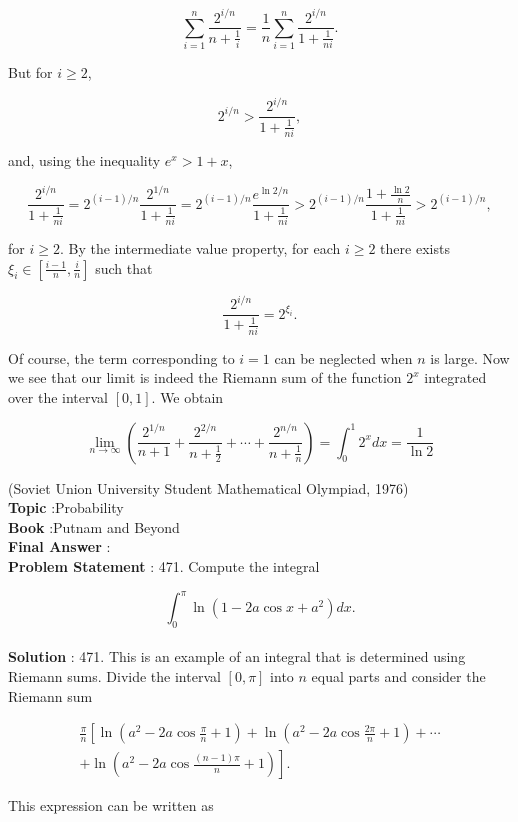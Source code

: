 \documentclass[10pt]{article}
\begin{document}
$$
\sum_{i=1}^{n} \frac{2^{i / n}}{n+\frac{1}{i}}=\frac{1}{n} \sum_{i=1}^{n} \frac{2^{i / n}}{1+\frac{1}{n i}} .
$$

But for $i \geq 2$,

$$
2^{i / n}>\frac{2^{i / n}}{1+\frac{1}{n i}},
$$

and, using the inequality $e^{x}>1+x$,

$$
\frac{2^{i / n}}{1+\frac{1}{n i}}=2^{(i-1) / n} \frac{2^{1 / n}}{1+\frac{1}{n i}}=2^{(i-1) / n} \frac{e^{\ln 2 / n}}{1+\frac{1}{n i}}>2^{(i-1) / n} \frac{1+\frac{\ln 2}{n}}{1+\frac{1}{n i}}>2^{(i-1) / n},
$$

for $i \geq 2$. By the intermediate value property, for each $i \geq 2$ there exists $\xi_{i} \in\left[\frac{i-1}{n}, \frac{i}{n}\right]$ such that

$$
\frac{2^{i / n}}{1+\frac{1}{n i}}=2^{\xi_{i}} .
$$

Of course, the term corresponding to $i=1$ can be neglected when $n$ is large. Now we see that our limit is indeed the Riemann sum of the function $2^{x}$ integrated over the interval $[0,1]$. We obtain

$$
\lim _{n \rightarrow \infty}\left(\frac{2^{1 / n}}{n+1}+\frac{2^{2 / n}}{n+\frac{1}{2}}+\cdots+\frac{2^{n / n}}{n+\frac{1}{n}}\right)=\int_{0}^{1} 2^{x} d x=\frac{1}{\ln 2}
$$

(Soviet Union University Student Mathematical Olympiad, 1976)
\\
\textbf{Topic} :Probability\\
\textbf{Book} :Putnam and Beyond\\
\textbf{Final Answer} :\\


\textbf{Problem Statement} :
471. Compute the integral

$$
\int_{0}^{\pi} \ln \left(1-2 a \cos x+a^{2}\right) d x .
$$
\\
\textbf{Solution} :
471. This is an example of an integral that is determined using Riemann sums. Divide the interval $[0, \pi]$ into $n$ equal parts and consider the Riemann sum

$$
\begin{array}{r}
\frac{\pi}{n}\left[\ln \left(a^{2}-2 a \cos \frac{\pi}{n}+1\right)+\ln \left(a^{2}-2 a \cos \frac{2 \pi}{n}+1\right)+\cdots\right. \\
\left.+\ln \left(a^{2}-2 a \cos \frac{(n-1) \pi}{n}+1\right)\right] .
\end{array}
$$

This expression can be written as
\end{document}
